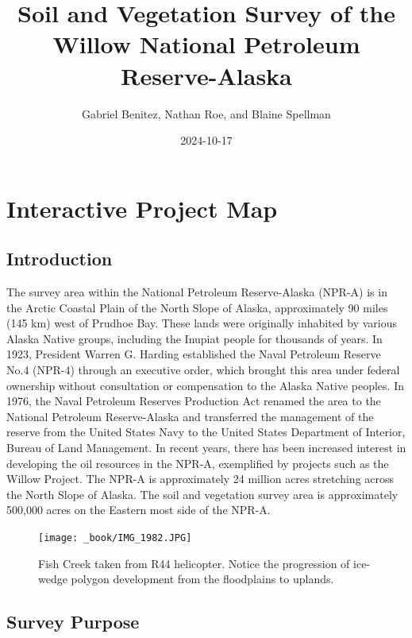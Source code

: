 \documentclass[
]{book}
\title{Soil and Vegetation Survey of the Willow National Petroleum Reserve-Alaska}
\author{Gabriel Benitez, Nathan Roe, and Blaine Spellman}
\date{2024-10-17}
\theoremstyle{definition}
\theoremstyle{definition}
\theoremstyle{definition}
\theoremstyle{definition}
\theoremstyle{remark}
\begin{document}
\maketitle

{
\setcounter{tocdepth}{1}
\tableofcontents
}
\hypertarget{interactive-project-map}{%
\chapter{Interactive Project Map}\label{interactive-project-map}}

\hypertarget{introduction}{%
\section{Introduction}\label{introduction}}

The survey area within the National Petroleum Reserve-Alaska (NPR-A) is in the Arctic Coastal Plain of the North Slope of Alaska, approximately 90 miles (145 km) west of Prudhoe Bay. These lands were originally inhabited by various Alaska Native groups, including the Inupiat people for thousands of years. In 1923, President Warren G. Harding established the Naval Petroleum Reserve No.4 (NPR-4) through an executive order, which brought this area under federal ownership without consultation or compensation to the Alaska Native peoples. In 1976, the Naval Petroleum Reserves Production Act renamed the area to the National Petroleum Reserve-Alaska and transferred the management of the reserve from the United States Navy to the United States Department of Interior, Bureau of Land Management. In recent years, there has been increased interest in developing the oil resources in the NPR-A, exemplified by projects such as the Willow Project. The NPR-A is approximately 24 million acres stretching across the North Slope of Alaska. The soil and vegetation survey area is approximately 500,000 acres on the Eastern most side of the NPR-A.

\begin{figure}
\centering
\texttt{[image: \_book/IMG\_1982.JPG]}
\caption{Fish Creek taken from R44 helicopter. Notice the progression of ice-wedge polygon development from the floodplains to uplands.}
\end{figure}

\hypertarget{survey-purpose}{%
\section{Survey Purpose}\label{survey-purpose}}
\end{document}
